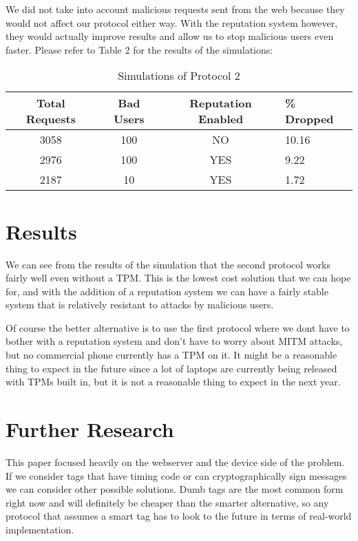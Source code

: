\documentclass{sig-alternate}
\begin{document}
We did not take into account malicious requests sent from the web
because they would not affect our protocol either way. With the
reputation system however, they would actually improve results and
allow us to stop malicious users even faster. Please refer to Table 2
for the results of the simulations:

\begin{table}
\centering
\caption{Simulations of Protocol 2}
\begin{tabular}{|c|c|c|l|} \hline
Total Requests&Bad Users&Reputation Enabled&\% Dropped\\ \hline
3058&100&NO&10.16\\ \hline
2976&100&YES&9.22\\ \hline
2187&10&YES&1.72\\ 
\hline\end{tabular}
\end{table}

\section{Results}
We can see from the results of the simulation that the second protocol
works fairly well even without a TPM. This is the lowest cost solution
that we can hope for, and with the addition of a reputation system we
can have a fairly stable system that is relatively resistant to
attacks by malicious users.

Of course the better alternative is to use the first protocol where we
dont have to bother with a reputation system and don't have to worry
about MITM attacks, but no commercial phone currently has a TPM on
it. It might be a reasonable thing to expect in the future since a lot
of laptops are currently being released with TPMs built in, but it is
not a reasonable thing to expect in the next year.

\section{Further Research}
This paper focused heavily on the webserver and the device side of the
problem. If we consider tags that have timing code or can
cryptographically sign messages we can consider other possible
solutions. Dumb tags are the most common form right now and will
definitely be cheaper than the smarter alternative, so any protocol
that assumes a smart tag has to look to the future in terms of
real-world implementation.
\end{document}
